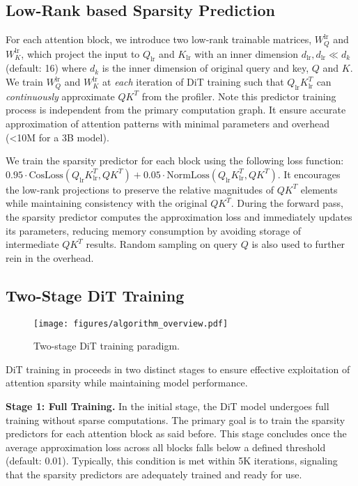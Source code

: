 \subsection{Low-Rank based Sparsity Prediction}
\label{sec:lowrank}
For each attention block, we introduce two low-rank trainable matrices, $W_Q^{\text{lr}}$ and $W_K^{\text{lr}}$, which project the input to $Q_{\text{lr}}$ and $K_{\text{lr}}$ with an inner dimension $d_{\text{lr}}, d_{\text{lr}} \ll d_k$ (default: 16) where $d_k$ is the inner dimension of original query and key, $Q$ and $K$. 
We train $W_Q^{\text{lr}}$ and $W_K^{\text{lr}}$ at \textit{each} iteration of DiT training such that $Q_{\text{lr}}K_{\text{lr}}^T$ can \textit{continuously} approximate $QK^T$ from the profiler. 
Note this predictor training process is independent from the primary computation graph. 
It ensure accurate approximation of attention patterns with minimal parameters and overhead (<10M for a 3B model).

We train the sparsity predictor for each block using the following loss function: $0.95\cdot \text{CosLoss}(Q_\text{lr}K_{\text{lr}}^{T}, QK^{T}) + 0.05\cdot \text{NormLoss}(Q_\text{lr}K_{\text{lr}}^{T}, QK^{T})$.
It encourages the low-rank projections to preserve the relative magnitudes of $QK^T$ elements while maintaining consistency with the original $QK^T$. During the forward pass, the sparsity predictor computes the approximation loss and immediately updates its parameters, reducing memory consumption by avoiding storage of intermediate $QK^T$ results. Random sampling on query $Q$ is also used to further rein in the overhead. 




\subsection{Two-Stage DiT Training}
\label{sec:two_stage}

\begin{figure}[t]
  \centering
  \texttt{[image: figures/algorithm\_overview.pdf]} 
  \caption{Two-stage DiT training paradigm.} 
  \label{fig:algorithm} 
\end{figure}



DiT training in \sys proceeds in two distinct stages to ensure effective exploitation of attention sparsity while maintaining model performance.


\noindent\textbf{Stage 1: Full Training.}
In the initial stage, the DiT model undergoes full training without sparse computations. The primary goal is to train the sparsity predictors for each attention block as said before. 
This stage concludes once the average approximation loss across all blocks falls below a defined threshold (default: 0.01). Typically, this condition is met within 5K iterations, signaling that the sparsity predictors are adequately trained and ready for use. 






